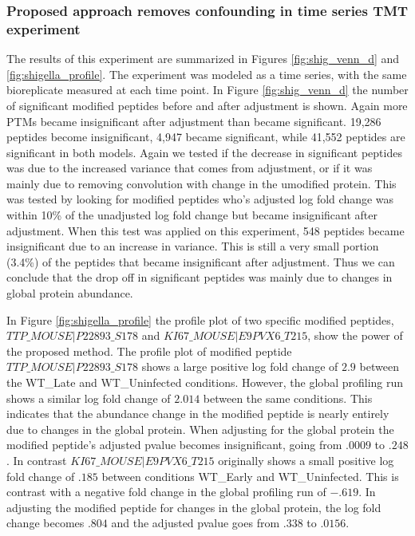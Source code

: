 \documentclass[mcp]{article}
\numberwithin{figure}{section} %
\numberwithin{table}{section}
\begin{document}
\subsubsection*{Proposed approach removes confounding in time series TMT experiment}

The results of this experiment are summarized in Figures \ref{fig:shig_venn_d} and \ref{fig:shigella_profile}. The experiment was modeled as a time series, with the same bioreplicate measured at each time point. In Figure \ref{fig:shig_venn_d} the number of significant modified peptides before and after adjustment is shown. Again more PTMs became insignificant after adjustment than became significant. 19,286 peptides become insignificant, 4,947 became significant, while 41,552 peptides are significant in both models. Again we tested if the decrease in significant peptides was due to the increased variance that comes from adjustment, or if it was mainly due to removing convolution with change in the umodified protein. This was tested by looking for modified peptides who's adjusted log fold change was within 10\% of the unadjusted log fold change but became insignificant after adjustment. When this test was applied on this experiment, 548 peptides became insignificant due to an increase in variance. This is still a very small portion (3.4\%) of the peptides that became insignificant after adjustment. Thus we can conclude that the drop off in significant peptides was mainly due to changes in global protein abundance.

In Figure \ref{fig:shigella_profile} the profile plot of two specific modified peptides, $TTP\_MOUSE|P22893\_S178$ and $KI67\_MOUSE|E9PVX6\_T215$, show the power of the proposed method.  The profile plot of modified peptide $TTP\_MOUSE|P22893\_S178$ shows a large positive log fold change of $2.9$ between the WT\_Late and WT\_Uninfected conditions. However, the global profiling run shows a similar log fold change of $2.014$ between the same conditions. This indicates that the abundance change in the modified peptide is nearly entirely due to changes in the global protein. When adjusting for the global protein the modified peptide's adjusted pvalue becomes insignificant, going from $.0009$ to $.248$. In contrast $KI67\_MOUSE|E9PVX6\_T215$ originally shows a small positive log fold change of $.185$ between conditions WT\_Early and WT\_Uninfected. This is contrast with a negative fold change in the global profiling run of $-.619$. In adjusting the modified peptide for changes in the global protein, the log fold change becomes $.804$ and the adjusted pvalue goes from $.338$ to $.0156$.
\end{document}
